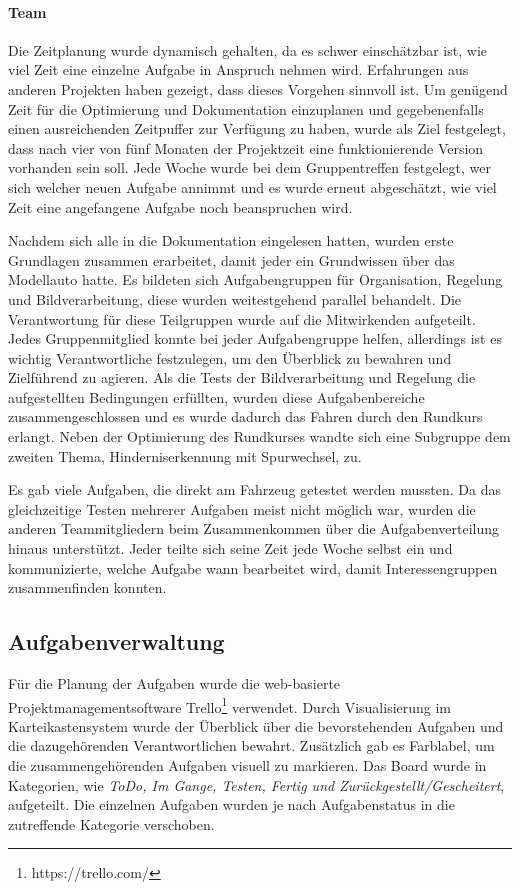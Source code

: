 \paragraph{Team}

Die Zeitplanung wurde dynamisch gehalten, da es schwer einschätzbar ist, wie viel Zeit eine einzelne Aufgabe in Anspruch nehmen wird. Erfahrungen aus anderen Projekten haben gezeigt, dass dieses Vorgehen sinnvoll ist. Um genügend Zeit für die Optimierung und Dokumentation einzuplanen und gegebenenfalls einen ausreichenden Zeitpuffer zur Verfügung zu haben, wurde als Ziel festgelegt, dass nach vier von fünf Monaten der Projektzeit eine funktionierende Version vorhanden sein soll. Jede Woche wurde bei dem Gruppentreffen festgelegt, wer sich welcher neuen Aufgabe annimmt und es wurde erneut abgeschätzt, wie viel Zeit eine angefangene Aufgabe noch beanspruchen wird.


Nachdem sich alle in die Dokumentation eingelesen hatten, wurden erste Grundlagen zusammen erarbeitet, damit jeder ein Grundwissen über das Modellauto hatte. Es bildeten sich Aufgabengruppen für Organisation, Regelung und Bildverarbeitung, diese wurden weitestgehend parallel behandelt. Die Verantwortung für diese Teilgruppen wurde auf die Mitwirkenden aufgeteilt. Jedes Gruppenmitglied konnte bei jeder Aufgabengruppe helfen, allerdings ist es wichtig Verantwortliche festzulegen, um den Überblick zu bewahren und Zielführend zu agieren. Als die Tests der Bildverarbeitung und Regelung die aufgestellten Bedingungen erfüllten, wurden diese Aufgabenbereiche zusammengeschlossen und es wurde dadurch das Fahren durch den Rundkurs erlangt. Neben der Optimierung des Rundkurses wandte sich eine Subgruppe dem zweiten Thema, Hinderniserkennung mit Spurwechsel, zu.

Es gab viele Aufgaben, die direkt am Fahrzeug getestet werden mussten. Da das gleichzeitige Testen mehrerer Aufgaben meist nicht möglich war, wurden die anderen Teammitgliedern beim Zusammenkommen über die Aufgabenverteilung hinaus unterstützt. Jeder teilte sich seine Zeit jede Woche selbst ein und kommunizierte, welche Aufgabe wann bearbeitet wird, damit Interessengruppen zusammenfinden konnten. 


\subsection{Aufgabenverwaltung}
\label{sec:aufgabenverwaltung}
Für die Planung der Aufgaben wurde die web-basierte Projektmanagementsoftware Trello\footnote{https://trello.com/} verwendet. Durch Visualisierung im Karteikastensystem wurde der Überblick über die bevorstehenden Aufgaben und die dazugehörenden Verantwortlichen bewahrt. Zusätzlich gab es Farblabel, um die zusammengehörenden Aufgaben visuell zu markieren. Das Board wurde in Kategorien, wie \textit{ToDo, Im Gange, Testen, Fertig und Zurückgestellt/Gescheitert}, aufgeteilt. Die einzelnen Aufgaben wurden je nach Aufgabenstatus in die zutreffende Kategorie verschoben. 

